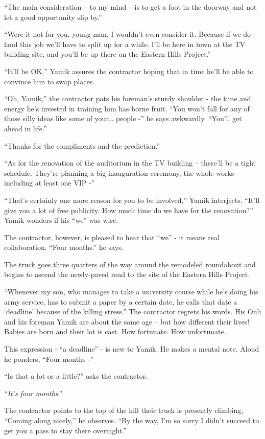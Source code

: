 \documentclass[twoside,11pt]{book}
\begin{document}
``The main consideration -- to my mind -- is to get a foot in the doorway and not let a good opportunity
slip by.''

``Were it not for you, young man, I wouldn't even consider it. Because if we do land this job we'll have to
split up for a while. I'll be here in town at the TV building site, and you'll be up there on the Eastern Hills
Project.''

``It'll be OK,'' Yamik assures the contractor hoping that in time he'll be able to convince
him to swap places.

``Oh, Yamik,'' the contractor pats his foreman's sturdy shoulder - the time and energy he's
invested in training him has borne fruit. ``You won't fall for any of those silly ideas like some of
your{\dots} people -'' he says awkwardly. ``You'll get ahead in life.''

``Thanks for the compliments and the prediction.''

``As for the renovation of the auditorium in the TV building -- there'll be a tight schedule. They're
planning a big inauguration ceremony, the whole works including at least one VIP -''

``That's certainly one more reason for you to be involved,'' Yamik interjects.
``It'll give you a lot of free publicity. How much time do we have for the renovation?''
Yamik wonders if his ``we'' was wise.

The contractor, however, is pleased to hear that ``we'' - it means real collaboration. ``Four
months.'' he says.

The truck goes three quarters of the way around the remodeled roundabout and begins to ascend the newly-paved road to
the site of the Eastern Hills Project.

``Whenever my son, who manages to take a university course while he's doing his army
service, has to submit a paper by a certain date, he calls that date a `deadline' because of the killing
stress.'' The contractor regrets his words. His Ouli and his foreman Yamik are about the same age -- but
how different their lives! Babies are born and their lot is cast. How fortunate. How unfortunate.

This expression - ``a deadline'' - is new to Yamik. He makes a mental note. Aloud he ponders,
``Four months -''

``Is that a lot or a little?'' asks the contractor.

``\textit{It's four months}.''

The contractor points to the top of the hill their truck is presently climbing, ``Coming along nicely,'' he
observes. ``By the way, I'm so sorry I didn't succeed to get you a pass to stay there overnight.''
\end{document}

